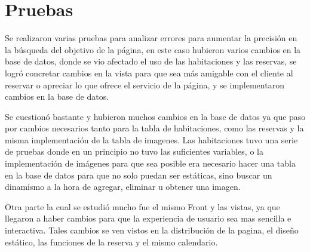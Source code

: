 \section{Pruebas}

Se realizaron varias pruebas para analizar errores para aumentar la precisión en la búsqueda del objetivo de la página, en este caso hubieron varios cambios en la base de datos, donde se vio afectado el uso de las habitaciones y las reservas, se logró concretar cambios en la vista para que sea más amigable con el cliente al reservar o apreciar lo que ofrece el servicio de la página, y se implementaron cambios en la base de datos.

Se cuestionó bastante y hubieron muchos cambios en la base de datos ya que paso por cambios necesarios tanto para la tabla de habitaciones, como las reservas y la misma implementación de la tabla de imagenes. Las habitaciones tuvo una serie de pruebas donde en un principio no tuvo las suficientes variables, o la implementación de imágenes para que sea posible era necesario hacer una tabla en la base de datos para que no solo puedan ser estáticas, sino buscar un dinamismo a la hora de agregar, eliminar u obtener una imagen.

Otra parte la cual se estudió mucho fue el mismo Front y las vistas, ya que llegaron a haber cambios para que la experiencia de usuario sea mas sencilla e interactiva. Tales cambios se ven vistos en la distribución de la pagina, el diseño estático, las funciones de la reserva y el mismo calendario.
